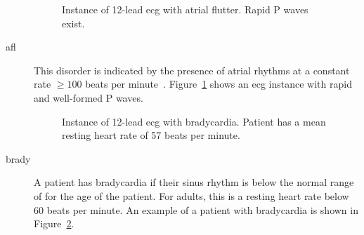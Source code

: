 \documentclass[\main/thesis.tex]{subfiles}
\begin{document}
\begin{description}
    \begin{figure}[ht]
        \centering
        \caption{Instance of 12-lead \gls{ecg} with atrial flutter. Rapid P waves exist.}
        \label{fig:full_AFL}
    \end{figure}
    \item[\gls{afl}] This disorder is indicated by the presence of atrial rhythms at a constant rate $\geq 100$ beats per minute~\cite{saoudi_classification_2001}. Figure~\ref{fig:full_AFL} shows an \gls{ecg} instance with rapid and well-formed P waves.

    \begin{figure}[ht]
        \centering
        \caption{Instance of 12-lead \gls{ecg} with bradycardia. Patient has a mean resting heart rate of 57 beats per minute.}
        \label{fig:full_Brady}
    \end{figure} 
    \item[\gls{brady}] A patient has bradycardia if their sinus rhythm is below the normal range of for the age of the patient. For adults, this is a resting heart rate below 60 beats per minute. An example of a patient with bradycardia is shown in Figure~\ref{fig:full_Brady}.


\end{description}
\end{document}
